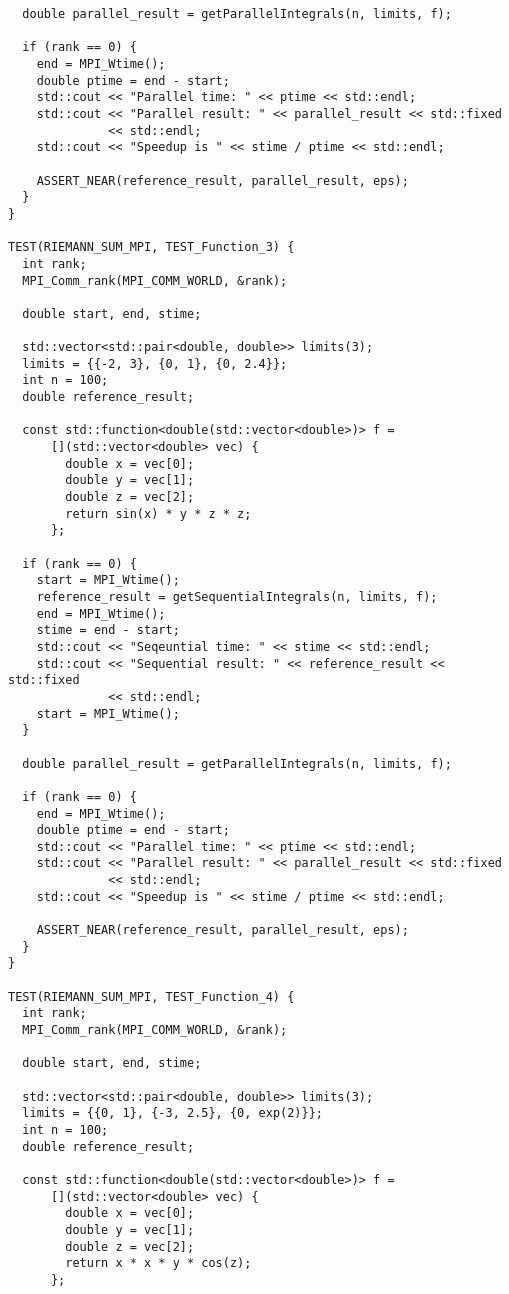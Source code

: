 \documentclass{report}
\begin{document}
\begin{lstlisting}
  double parallel_result = getParallelIntegrals(n, limits, f);

  if (rank == 0) {
    end = MPI_Wtime();
    double ptime = end - start;
    std::cout << "Parallel time: " << ptime << std::endl;
    std::cout << "Parallel result: " << parallel_result << std::fixed
              << std::endl;
    std::cout << "Speedup is " << stime / ptime << std::endl;

    ASSERT_NEAR(reference_result, parallel_result, eps);
  }
}

TEST(RIEMANN_SUM_MPI, TEST_Function_3) {
  int rank;
  MPI_Comm_rank(MPI_COMM_WORLD, &rank);

  double start, end, stime;

  std::vector<std::pair<double, double>> limits(3);
  limits = {{-2, 3}, {0, 1}, {0, 2.4}};
  int n = 100;
  double reference_result;

  const std::function<double(std::vector<double>)> f =
      [](std::vector<double> vec) {
        double x = vec[0];
        double y = vec[1];
        double z = vec[2];
        return sin(x) * y * z * z;
      };

  if (rank == 0) {
    start = MPI_Wtime();
    reference_result = getSequentialIntegrals(n, limits, f);
    end = MPI_Wtime();
    stime = end - start;
    std::cout << "Seqeuntial time: " << stime << std::endl;
    std::cout << "Sequential result: " << reference_result << std::fixed
              << std::endl;
    start = MPI_Wtime();
  }

  double parallel_result = getParallelIntegrals(n, limits, f);

  if (rank == 0) {
    end = MPI_Wtime();
    double ptime = end - start;
    std::cout << "Parallel time: " << ptime << std::endl;
    std::cout << "Parallel result: " << parallel_result << std::fixed
              << std::endl;
    std::cout << "Speedup is " << stime / ptime << std::endl;

    ASSERT_NEAR(reference_result, parallel_result, eps);
  }
}

TEST(RIEMANN_SUM_MPI, TEST_Function_4) {
  int rank;
  MPI_Comm_rank(MPI_COMM_WORLD, &rank);

  double start, end, stime;

  std::vector<std::pair<double, double>> limits(3);
  limits = {{0, 1}, {-3, 2.5}, {0, exp(2)}};
  int n = 100;
  double reference_result;

  const std::function<double(std::vector<double>)> f =
      [](std::vector<double> vec) {
        double x = vec[0];
        double y = vec[1];
        double z = vec[2];
        return x * x * y * cos(z);
      };


\end{lstlisting}
\end{document}
